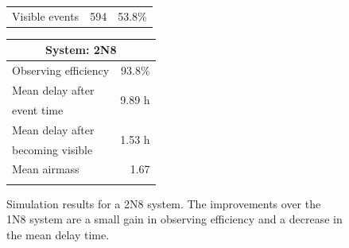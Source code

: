 \begin{colsection}
\begin{figure}[p]
\begin{center}
\begin{minipage}[t]{0.45\linewidth}
\begin{tabular}{lrr}
                \midrule
                Visible events & 594 &  53.8\% \\
            \end{tabular}
        \end{minipage}
        \begin{minipage}[t]{0.37\linewidth}\vspace{0pt}
            \begin{tabular}{lr}
                \multicolumn{2}{c}{\textbf{System: 2N8}} \\
                \midrule
                Observing efficiency & 93.8\% \\
                \midrule
                Mean delay after     & \multirow{2}{*}{9.89 h} \\
                event time           & \\
                Mean delay after     & \multirow{2}{*}{1.53 h} \\
                becoming visible     & \\
                \midrule
                Mean airmass         & 1.67 \\
                & \\
            \end{tabular}
        \end{minipage}
    \end{center}
    \caption[GW simulation results: 2N8 system]{
        Simulation results for a 2N8 system. The improvements over the 1N8 system are a small gain in observing efficiency and a decrease in the mean delay time.
    }\label{fig:gw_sim_2n8}
\end{figure}

\newpage


\end{colsection}
